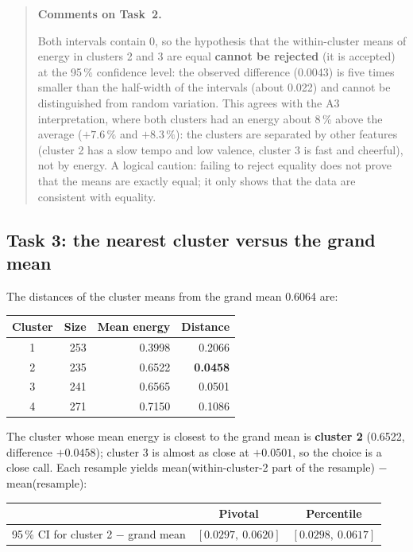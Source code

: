 \documentclass[11pt,letterpaper]{article}
\newenvironment{taskcomments}[1][Comments]{%
  \par\medskip\noindent
  \begin{quote}\small\textbf{#1.}\enspace\ignorespaces
}{%
  \end{quote}\medskip
}
\begin{document}
\begin{taskcomments}[Comments on Task~2]
Both intervals contain 0, so the hypothesis that the within-cluster means of
energy in clusters 2 and 3 are equal \textbf{cannot be rejected} (it is
accepted) at the 95\,\% confidence level: the observed difference (0.0043) is
five times smaller than the half-width of the intervals (about 0.022) and
cannot be distinguished from random variation. This agrees with the A3
interpretation, where both clusters had an energy about 8\,\% above the
average ($+7.6\,\%$ and $+8.3\,\%$): the clusters are separated by other
features (cluster 2 has a slow tempo and low valence, cluster 3 is fast and
cheerful), not by energy. A logical caution: failing to reject equality does
not prove that the means are exactly equal; it only shows that the data are
consistent with equality.
\end{taskcomments}

\subsection{Task 3: the nearest cluster versus the grand mean}\label{sec:a5t3}

The distances of the cluster means from the grand mean 0.6064 are:
\begin{center}
\small
\begin{tabular}{crrr}
\toprule
Cluster & Size & Mean energy & Distance \\
\midrule
1 & 253 & 0.3998 & 0.2066 \\
2 & 235 & 0.6522 & \textbf{0.0458} \\
3 & 241 & 0.6565 & 0.0501 \\
4 & 271 & 0.7150 & 0.1086 \\
\bottomrule
\end{tabular}
\end{center}
The cluster whose mean energy is closest to the grand mean is \textbf{cluster
2} (0.6522, difference $+0.0458$); cluster 3 is almost as close at $+0.0501$,
so the choice is a close call. Each resample yields
mean(within-cluster-2 part of the resample) $-$ mean(resample):
\begin{center}
\small
\begin{tabular}{lcc}
\toprule
 & Pivotal & Percentile \\
\midrule
95\,\% CI for cluster 2 $-$ grand mean & $[0.0297,\ 0.0620]$ & $[0.0298,\ 0.0617]$ \\
\bottomrule
\end{tabular}
\end{center}
\end{document}
